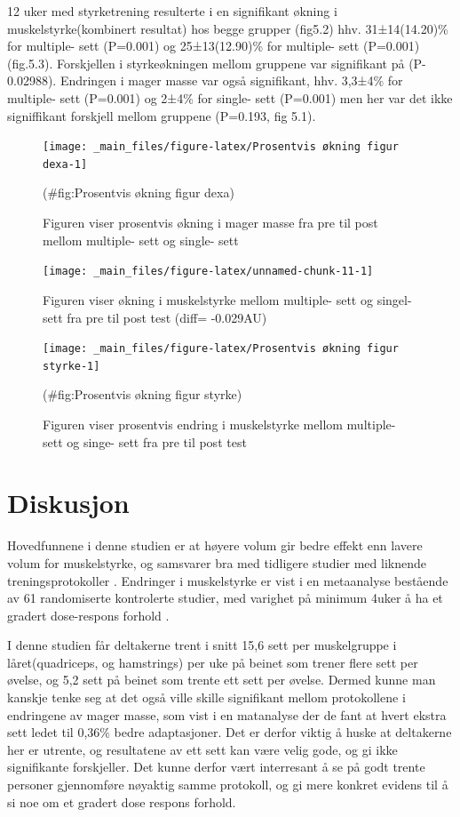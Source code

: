\documentclass[
]{book}
\begin{document}
12 uker med styrketrening resulterte i en signifikant økning i muskelstyrke(kombinert resultat) hos begge grupper (fig5.2) hhv. 31±14(14.20)\% for multiple- sett (P=0.001) og 25±13(12.90)\% for multiple- sett (P=0.001)(fig.5.3). Forskjellen i styrkeøkningen mellom gruppene var signifikant på (P- 0.02988). Endringen i mager masse var også signifikant, hhv. 3,3±4\% for multiple- sett (P=0.001) og 2±4\% for single- sett (P=0.001) men her var det ikke signiffikant forskjell mellom gruppene (P=0.193, fig 5.1).

\begin{figure}
\texttt{[image: \_main\_files/figure-latex/Prosentvis økning figur dexa-1]} \caption{Figuren viser prosentvis økning i mager masse fra pre til post mellom multiple- sett og single- sett}(\#fig:Prosentvis økning figur dexa)
\end{figure}

\begin{figure}
\texttt{[image: \_main\_files/figure-latex/unnamed-chunk-11-1]} \caption{Figuren viser økning i muskelstyrke mellom multiple- sett og singel- sett fra pre til post test (diff= -0.029AU)}\label{fig:unnamed-chunk-11}
\end{figure}

\begin{figure}
\texttt{[image: \_main\_files/figure-latex/Prosentvis økning figur styrke-1]} \caption{Figuren viser prosentvis endring i muskelstyrke mellom multiple- sett og singe- sett fra pre til post test}(\#fig:Prosentvis økning figur styrke)
\end{figure}

\hypertarget{diskusjon-2}{%
\section{Diskusjon}\label{diskusjon-2}}

Hovedfunnene i denne studien er at høyere volum gir bedre effekt enn lavere volum for muskelstyrke, og samsvarer bra med tidligere studier med liknende treningsprotokoller \citep{rønnestad2007, starkey1996, radaelli2015}. Endringer i muskelstyrke er vist i en metaanalyse bestående av 61 randomiserte kontrolerte studier, med varighet på minimum 4uker å ha et gradert dose-respons forhold \citep{Ralston2017}.

I denne studien får deltakerne trent i snitt 15,6 sett per muskelgruppe i låret(quadriceps, og hamstrings) per uke på beinet som trener flere sett per øvelse, og 5,2 sett på beinet som trente ett sett per øvelse. Dermed kunne man kanskje tenke seg at det også ville skille signifikant mellom protokollene i endringene av mager masse, som vist i en matanalyse der de fant at hvert ekstra sett ledet til 0,36\% bedre adaptasjoner\citep{schoenfeld2016}. Det er derfor viktig å huske at deltakerne her er utrente, og resultatene av ett sett kan være velig gode, og gi ikke signifikante forskjeller\citep{bottaro2011, galvao2005, mcbride2003}. Det kunne derfor vært interresant å se på godt trente personer gjennomføre nøyaktig samme protokoll, og gi mere konkret evidens til å si noe om et gradert dose respons forhold.
\end{document}
